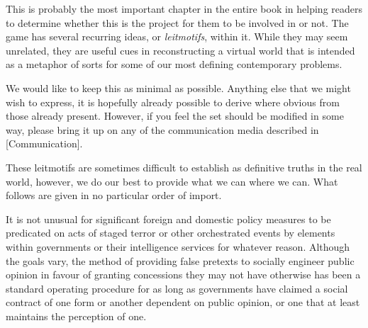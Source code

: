 

This is probably the most important chapter in the entire book in helping readers to determine whether this is the project for them to be involved in or not. The game has several recurring ideas, or {\it leitmotifs}, within it. While they may seem unrelated, they are useful cues in reconstructing a virtual world that is intended as a metaphor of sorts for some of our most defining contemporary problems.

We would like to keep this  as minimal as possible. Anything else that we might wish to express, it is hopefully already possible to derive where obvious from those already present. However, if you feel the set should be modified in some way, please bring it up on any of the communication media described in [Communication]. 

These leitmotifs are sometimes difficult to establish as definitive truths in the real world, however, we do our best to provide what we can where we can. What follows are given in no particular order of import.

\startitemize[4]

It is not unusual for significant foreign and domestic policy measures to be predicated on acts of staged terror or other orchestrated events by elements within governments or their intelligence services for whatever reason. Although the goals vary, the method of providing false pretexts to socially engineer public opinion in favour of granting concessions they may not have otherwise has been a standard operating procedure for as long as governments have claimed a social contract of one form or another dependent on public opinion, or one that at least maintains the perception of one.

